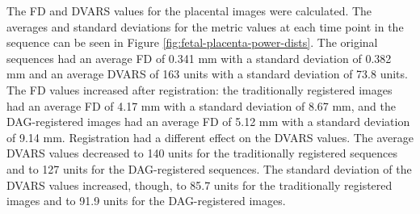 The FD and DVARS values for the placental images were calculated. The averages and standard deviations for the metric values at each time point in the sequence can be seen in Figure \ref{fig:fetal-placenta-power-dists}. The original sequences had an average FD of 0.341 mm with a standard deviation of 0.382 mm and an average DVARS of 163 units with a standard deviation of 73.8 units. The FD values increased after registration: the traditionally registered images had an average FD of 4.17 mm with a standard deviation of 8.67 mm, and the DAG-registered images had an average FD of 5.12 mm with a standard deviation of 9.14 mm. Registration had a different effect on the DVARS values. The average DVARS values decreased to 140 units for the traditionally registered sequences and to 127 units for the DAG-registered sequences. The standard deviation of the DVARS values increased, though, to 85.7 units for the traditionally registered images and to 91.9 units for the DAG-registered images. 

